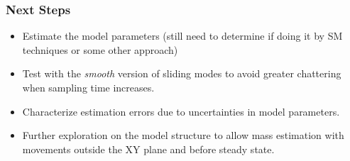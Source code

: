 \documentclass[9pt,spanish,aspectratio=1610]{beamer}
\begin{document}
\begin{frame}\frametitle{Next Steps}
\begin{itemize}
\item Estimate the model parameters (still need to determine if doing it by SM techniques or some other approach)
\item Test with the \textit{smooth} version of sliding modes to avoid greater chattering when sampling time increases.
\item Characterize estimation errors due to uncertainties in model parameters.
\item Further exploration on the model structure to allow mass estimation with movements outside the XY plane and before steady state.
\end{itemize}  
\end{frame}
\end{document}

